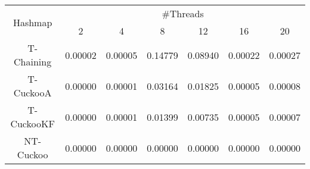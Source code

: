 \begin{tabular}{|c|c|c|c|c|c|c|}
\hline
\multirow{2}{*}{Hashmap} & \multicolumn{6}{c|}{\#Threads}\\\cline{2-7}& 2 & 4 & 8 & 12 & 16 & 20\\
\hline
\hline
T-Chaining & 0.00002 & 0.00005 & 0.14779 & 0.08940 & 0.00022 & 0.00027\\
T-CuckooA & 0.00000 & 0.00001 & 0.03164 & 0.01825 & 0.00005 & 0.00008\\
T-CuckooKF & 0.00000 & 0.00001 & 0.01399 & 0.00735 & 0.00005 & 0.00007\\
NT-Cuckoo & 0.00000 & 0.00000 & 0.00000 & 0.00000 & 0.00000 & 0.00000\\
\hline
\end{tabular}
